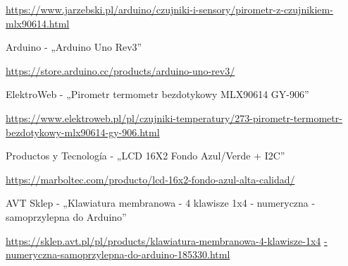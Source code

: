 \begin{thebibliography}{999}
\begin{spacing}{1}
    \url{https://www.jarzebski.pl/arduino/czujniki-i-sensory/pirometr-z-czujnikiem-mlx90614.html}

     Arduino - „Arduino Uno Rev3”

    \url{https://store.arduino.cc/products/arduino-uno-rev3/}

      ElektroWeb - „Pirometr termometr bezdotykowy MLX90614 GY-906”
    
    \url{https://www.elektroweb.pl/pl/czujniki-temperatury/273-pirometr-termometr-bezdotykowy-mlx90614-gy-906.html}

     Productos y Tecnología - „LCD 16X2 Fondo Azul/Verde + I2C”
    
    \url{https://marboltec.com/producto/lcd-16x2-fondo-azul-alta-calidad/}


     AVT Sklep - „Klawiatura membranowa - 4 klawisze 1x4 - numeryczna - samoprzylepna do Arduino”
    
    \url{https://sklep.avt.pl/pl/products/klawiatura-membranowa-4-klawisze-1x4}
    \url{-numeryczna-samoprzylepna-do-arduino-185330.html}

\end{spacing}
\end{thebibliography}